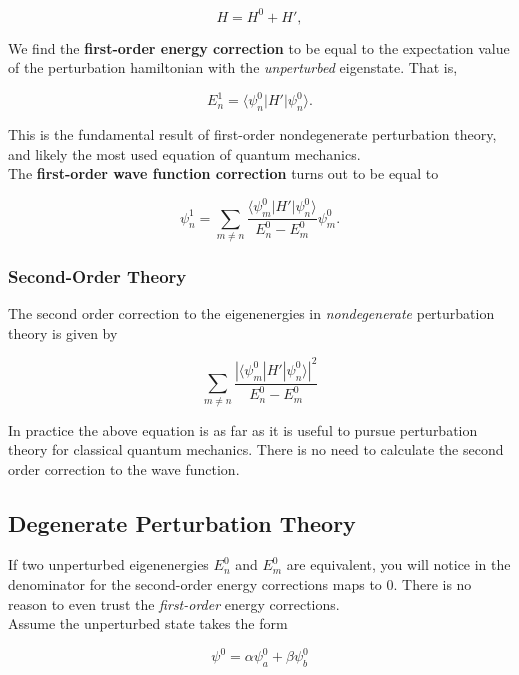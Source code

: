 \documentclass[svgnames]{article}
\begin{document}
\[
H = H^{0} + H',
\] \vspace{3px}

We find the \textbf{first-order energy correction} to be equal to the expectation 
value of the perturbation hamiltonian with the \textit{unperturbed} eigenstate. That is, 

\[
    \boxed{
E_n^{1} = \langle \psi_n^{0} | H' | \psi_n^{0} \rangle .
}
\] \vspace{3px}

This is the fundamental result of first-order nondegenerate perturbation theory, and likely the most 
used equation of quantum mechanics. \\

The \textbf{first-order wave function correction} turns out to be equal to 

\[
    \boxed{
\psi_n^{1} = \sum_{m\neq n }^{} \frac{\langle \psi_m^{0} | H' |\psi_n^{0} \rangle}{E_n^{0} - E_m^{0}}\psi_m^{0}.
}\] \vspace{3px}

\subsubsection{Second-Order Theory} 

The second order correction to the eigenenergies in \textit{nondegenerate} perturbation theory 
is given by 

\[
\boxed{ 
\sum_{m\neq n}^{} \frac{|\langle \psi_m^{0}|H'|\psi_n^{0} \rangle |^2}{E_n^{0} - E_m^{0}}
}
\] \vspace{3px}

In practice the above equation is as far as it is useful to pursue perturbation theory for classical 
quantum mechanics. There is no need to calculate the second order correction to the wave function. 

\subsection{Degenerate Perturbation Theory}

If two unperturbed eigenenergies $E_n^{0}$ and $E_m^{0}$ are equivalent, you will notice in the denominator 
for the second-order energy corrections maps to 0. There is no reason to even trust the \textit{first-order} 
energy corrections. \\

Assume the unperturbed state takes the form 

\[
\psi^{0} = \alpha \psi_a^{0} + \beta \psi_b^{0}
\] \vspace{3px}
\end{document}
